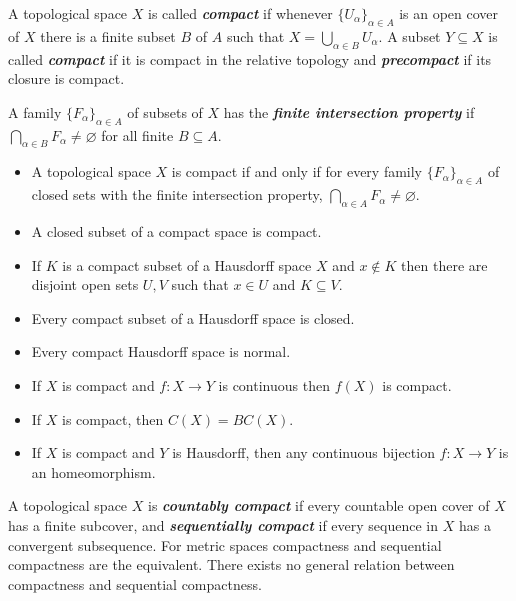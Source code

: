 \documentclass{article}
\theoremstyle{definition}
\numberwithin{equation}{section}
\begin{document}
	A topological space $X$ is called \textbf{\textit{compact}} if whenever $\{U_\alpha\}_{\alpha\in A}$ is an open cover of $X$ there is a finite subset $B$ of $A$ such that $X=\bigcup_{\alpha\in B}U_\alpha$. A subset $Y\subseteq X$ is called \textbf{\textit{compact}} if it is compact in the relative topology and \textbf{\textit{precompact}} if its closure is compact.
	
	A family $\{F_\alpha\}_{\alpha\in A}$ of subsets of $X$ has the \textbf{\textit{finite intersection property}} if $\bigcap_{\alpha\in B}F_\alpha\neq\varnothing$ for all finite $B\subseteq A$.
	
	\begin{prop}\leavevmode
		\begin{itemize}
			\item A topological space $X$ is compact if and only if for every family $\{F_\alpha\}_{\alpha\in A}$ of closed sets with the finite intersection property, $\bigcap_{\alpha\in A}F_\alpha\neq\varnothing$.
			\item A closed subset of a compact space is compact.
			\item If $K$ is a compact subset of a Hausdorff space $X$ and $x\notin K$ then there are disjoint open sets $U,V$ such that $x\in U$ and $K\subseteq V$.
			\item Every compact subset of a Hausdorff space is closed.
			\item Every compact Hausdorff space is normal.
			\item If $X$ is compact and $f:X\to Y$ is continuous then $f(X)$ is compact.
			\item If $X$ is compact, then $C(X)=BC(X)$.
			\item If $X$ is compact and $Y$ is Hausdorff, then any continuous bijection $f:X\to Y$ is an homeomorphism.
		\end{itemize}
	\end{prop}
	A topological space $X$ is \textbf{\textit{countably compact}} if every countable open cover of $X$ has a finite subcover, and \textbf{\textit{sequentially compact}} if every sequence in $X$ has a convergent subsequence. For metric spaces compactness and sequential compactness are the equivalent. There exists no general relation between compactness and sequential compactness.
	
\end{document}
